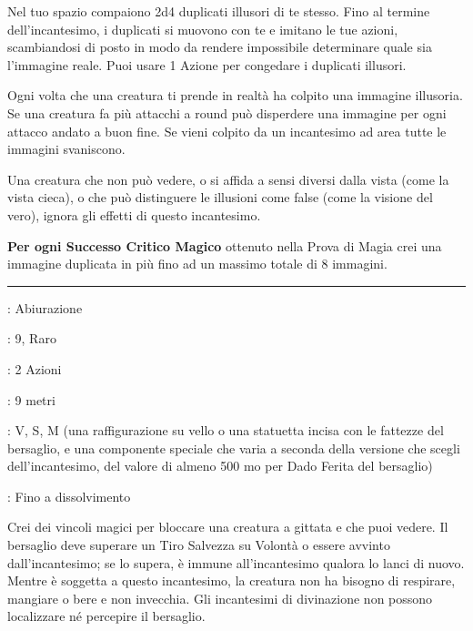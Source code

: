 \begin{multicols}{2}
Nel tuo spazio compaiono 2d4 duplicati illusori di te stesso. Fino al termine dell'incantesimo, i duplicati si muovono con te e imitano le tue azioni, scambiandosi di posto in modo da rendere impossibile determinare quale sia l'immagine reale. Puoi usare 1 Azione per congedare i duplicati illusori.

Ogni volta che una creatura ti prende in realtà ha colpito una immagine illusoria.
Se una creatura fa più attacchi a round può disperdere una immagine per ogni attacco andato a buon fine. Se vieni colpito da un incantesimo ad area tutte le immagini svaniscono.

Una creatura che non può vedere, o si affida a sensi diversi dalla vista (come la vista cieca), o che può distinguere le illusioni come false (come la visione del vero), ignora gli effetti di questo incantesimo.

\textbf{Per ogni Successo Critico Magico} ottenuto nella Prova di Magia crei una immagine duplicata in più fino ad un massimo totale di 8 immagini.

\smallskip\noindent\rule{\linewidth}{2pt} \hypertarget{Imprigionare}{}\medskip{}
\noindent
\begin{description}[noitemsep, topsep=0pt, parsep=0pt, partopsep=0pt, leftmargin=0cm, labelwidth=2.8cm]
	\item[\textbf{Lista di Magia}]: Abiurazione
	\item[\textbf{Livello}]: 9, Raro
	\item[\textbf{T. di Lancio}]: 2 Azioni
	\item[\textbf{Gittata}]: 9 metri
	\item[\textbf{Componenti}]: V, S, M (una raffigurazione su vello o una statuetta incisa con le fattezze del bersaglio, e una componente speciale che varia a seconda della versione che scegli dell'incantesimo, del valore di almeno 500 mo per Dado Ferita del bersaglio)
	\item[\textbf{Durata}]: Fino a dissolvimento
\end{description}

Crei dei vincoli magici per bloccare una creatura a gittata e che puoi vedere. Il bersaglio deve superare un Tiro Salvezza su Volontà o essere avvinto dall'incantesimo; se lo supera, è immune all'incantesimo qualora lo lanci di nuovo. Mentre è soggetta a questo incantesimo, la creatura non ha bisogno di respirare, mangiare o bere e non invecchia. Gli incantesimi di divinazione non possono localizzare né percepire il bersaglio.


\end{multicols}
